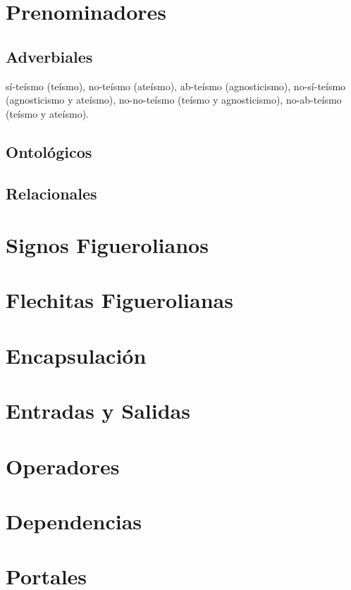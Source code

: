 \documentclass[12pt]{report}
\begin{document}
	\section{Prenominadores}
	\subsection{Adverbiales}
	sí-teísmo (teísmo), no-teísmo (ateísmo), ab-teísmo (agnosticismo), no-sí-teísmo (agnosticismo y ateísmo), no-no-teísmo (teísmo y agnosticismo), no-ab-teísmo (teísmo y ateísmo).
	
	\subsection{Ontológicos}
	\subsection{Relacionales}
	
	
	
	\section{Signos Figuerolianos}
	
	
	\section{Flechitas Figuerolianas}
	
	
	\section{Encapsulación}
	
	
	
	
	\section{Entradas y Salidas}
	\section{Operadores}
	\section{Dependencias}
	\section{Portales}
	
\end{document}
